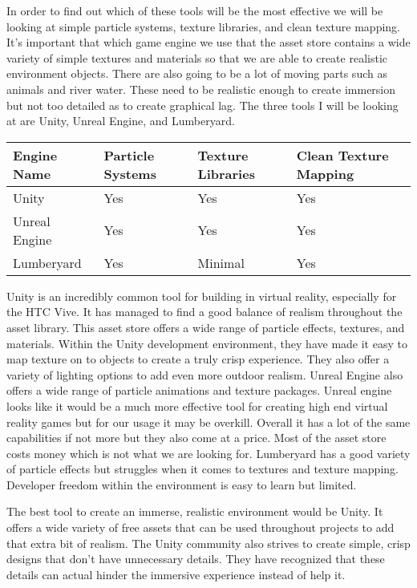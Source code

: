 \documentclass[10pt,journal,compsoc,onecolumn, draftclsnofoot]{IEEEtran}
\begin{document}
In order to find out which of these tools will be the most effective we will be looking at simple particle systems, texture libraries, and clean texture mapping. It’s important that which game engine we use that the asset store contains a wide variety of simple textures and materials so that we are able to create realistic environment objects. There are also going to be a lot of moving parts such as animals and river water. These need to be realistic enough to create immersion but not too detailed as to create graphical lag. The three tools I will be looking at are Unity, Unreal Engine, and Lumberyard.

\vspace{2mm}
\begin{table}[h!]
\centering
  \begin{tabu} to 1.0\textwidth { | X[l] || X[c] | X[c] | X[c] |  }
  \hline
  Engine Name & Particle Systems & Texture Libraries & Clean Texture Mapping\\
  \hline
  Unity  & Yes & Yes & Yes\\
  Unreal Engine & Yes & Yes & Yes\\
  Lumberyard & Yes & Minimal & Yes \\
  \hline
  \end{tabu}
\end{table}
\vspace{2mm}

Unity is an incredibly common tool for building in virtual reality, especially for the HTC Vive. It has managed to find a good balance of realism throughout the asset library. This asset store offers a wide range of particle effects, textures, and materials. Within the Unity development environment, they have made it easy to map texture on to objects to create a truly crisp experience. They also offer a variety of lighting options to add even more outdoor realism. Unreal Engine also offers a wide range of particle animations and texture packages. Unreal engine looks like it would be a much more effective tool for creating high end virtual reality games but for our usage it may be overkill. Overall it has a lot of the same capabilities if not more but they also come at a price. Most of the asset store costs money which is not what we are looking for. Lumberyard has a good variety of particle effects but struggles when it comes to textures and texture mapping. Developer freedom within the environment is easy to learn but limited.

The best tool to create an immerse, realistic environment would be Unity. It offers a wide variety of free assets that can be used throughout projects to add that extra bit of realism. The Unity community also strives to create simple, crisp designs that don’t have unnecessary details. They have recognized that these details can actual hinder the immersive experience instead of help it.
\vspace{2mm
}
\end{document}
